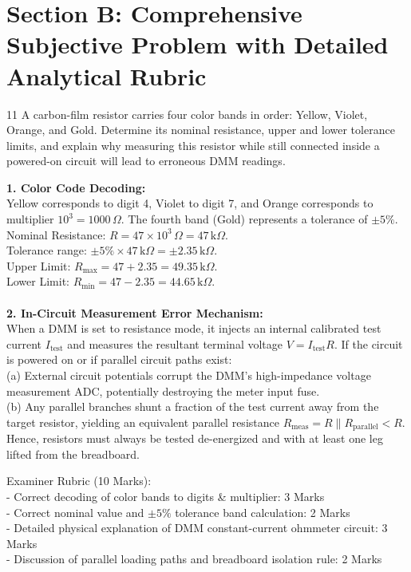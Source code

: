 \newpage
\section{Section B: Comprehensive Subjective Problem with Detailed Analytical Rubric}

\begin{subjectiveq}{1}{1}
A carbon-film resistor carries four color bands in order: Yellow, Violet, Orange, and Gold. Determine its nominal resistance, upper and lower tolerance limits, and explain why measuring this resistor while still connected inside a powered-on circuit will lead to erroneous DMM readings.
\end{subjectiveq}

\begin{solbox}
\textbf{1. Color Code Decoding:}\\
Yellow corresponds to digit 4, Violet to digit 7, and Orange corresponds to multiplier $10^3 = 1000\,\Omega$. The fourth band (Gold) represents a tolerance of $\pm 5\%$.\\
Nominal Resistance: $R = 47 \times 10^3\,\Omega = 47\,\mathrm{k}\Omega$.\\
Tolerance range: $\pm 5\% \times 47\,\mathrm{k}\Omega = \pm 2.35\,\mathrm{k}\Omega$.\\
Upper Limit: $R_{\max} = 47 + 2.35 = 49.35\,\mathrm{k}\Omega$.\\
Lower Limit: $R_{\min} = 47 - 2.35 = 44.65\,\mathrm{k}\Omega$.\\\\
\textbf{2. In-Circuit Measurement Error Mechanism:}\\
When a DMM is set to resistance mode, it injects an internal calibrated test current $I_{\mathrm{test}}$ and measures the resultant terminal voltage $V = I_{\mathrm{test}} R$. If the circuit is powered on or if parallel circuit paths exist:\\
(a) External circuit potentials corrupt the DMM's high-impedance voltage measurement ADC, potentially destroying the meter input fuse.\\
(b) Any parallel branches shunt a fraction of the test current away from the target resistor, yielding an equivalent parallel resistance $R_{\mathrm{meas}} = R \parallel R_{\mathrm{parallel}} < R$. Hence, resistors must always be tested de-energized and with at least one leg lifted from the breadboard.
\end{solbox}

\begin{examinertip}
Examiner Rubric (10 Marks):\\
- Correct decoding of color bands to digits \& multiplier: 3 Marks\\
- Correct nominal value and $\pm 5\%$ tolerance band calculation: 2 Marks\\
- Detailed physical explanation of DMM constant-current ohmmeter circuit: 3 Marks\\
- Discussion of parallel loading paths and breadboard isolation rule: 2 Marks
\end{examinertip}


